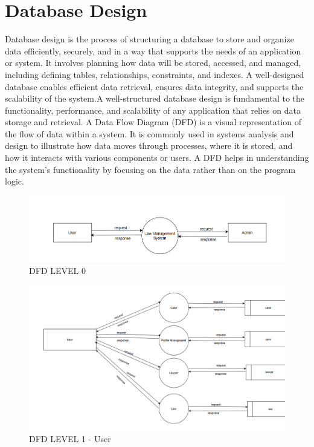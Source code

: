 \section{Database Design}
%
Database design is the process of structuring a database to store and organize data efficiently, securely, and in a way that supports the needs of an application or system. It involves planning how data will be stored, accessed, and managed, including defining tables, relationships, constraints, and indexes. A well-designed database enables efficient data retrieval, ensures data integrity, and supports the scalability of the system.A well-structured database design is fundamental to the functionality, performance, and scalability of any application that relies on data storage and retrieval.
A Data Flow Diagram (DFD) is a visual representation of the flow of data within a system. It is commonly used in systems analysis and design to illustrate how data moves through processes, where it is stored, and how it interacts with various components or users. A DFD helps in understanding the system's functionality by focusing on the data rather than on the program logic.

\begin{figure}[h]
  \centering
  \includegraphics[width=0.8\linewidth]{LawDFD0.png}
 \caption{DFD LEVEL 0}
   \label{fig:DFD LEVEL 0}
\end{figure}


\begin{figure}[h]
  \centering
  \includegraphics[width=0.8\linewidth]{LawDFD1User.png}
 \caption{DFD LEVEL 1 - User}
   \label{fig:DFD LEVEL 1 - User}
\end{figure}


